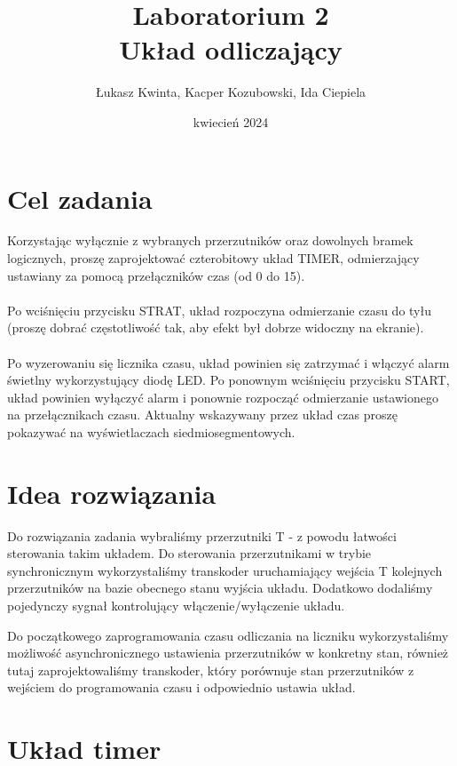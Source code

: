 \documentclass[a4paper]{article}
\title{\fontsize{30pt}{30pt}\selectfont Laboratorium 2 \\ Układ odliczający}
\author{\fontsize{20pt}{20pt}\selectfont Łukasz Kwinta, Kacper Kozubowski, Ida Ciepiela}
\date{kwiecień 2024}
\begin{document}
\maketitle
\pagebreak
\large
\tableofcontents

\pagebreak
\section{Cel zadania}
\Large
Korzystając wyłącznie z wybranych przerzutników oraz dowolnych bramek logicznych, proszę zaprojektować czterobitowy układ TIMER, odmierzający ustawiany za pomocą przełączników czas (od 0 do 15).
\\\\
Po wciśnięciu przycisku STRAT, układ rozpoczyna odmierzanie czasu do tyłu (proszę dobrać częstotliwość tak, aby efekt był dobrze widoczny na ekranie). 
\\\\
Po wyzerowaniu się licznika czasu, układ powinien się zatrzymać i włączyć alarm świetlny wykorzystujący diodę LED. Po ponownym wciśnięciu przycisku START, 
układ powinien wyłączyć alarm i ponownie rozpocząć odmierzanie ustawionego na przełącznikach czasu.
Aktualny wskazywany przez układ czas proszę pokazywać na wyświetlaczach siedmiosegmentowych.

\section{Idea rozwiązania}
Do rozwiązania zadania wybraliśmy przerzutniki T - z powodu łatwości sterowania takim układem. Do sterowania przerzutnikami
w trybie synchronicznym wykorzystaliśmy transkoder uruchamiający wejścia T kolejnych przerzutników na bazie obecnego 
stanu wyjścia układu. Dodatkowo dodaliśmy pojedynczy sygnał kontrolujący włączenie/wyłączenie układu.

Do początkowego zaprogramowania czasu odliczania na liczniku wykorzystaliśmy możliwość asynchronicznego ustawienia przerzutników
w konkretny stan, również tutaj zaprojektowaliśmy transkoder, który porównuje stan przerzutników z wejściem do programowania 
czasu i odpowiednio ustawia układ. 

\pagebreak
\section{Układ timer}
\end{document}
